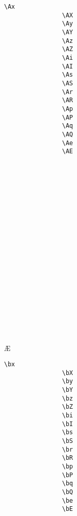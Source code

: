 \documentclass[10pt, a4paper]{article}
\begin{document}
\begin{enumerate}
		\begin{center}
			\begin{minipage}[h][8cm][t]{15em}
				\begin{lstlisting}[style=B]
				\Ax
				\AX
				\Ay
				\AY
				\Az
				\AZ
				\Ai
				\AI
				\As
				\AS
				\Ar
				\AR
				\Ap
				\AP
				\Aq
				\AQ
				\Ae
				\AE
				\end{lstlisting}
			\end{minipage}
			\begin{minipage}[h][8cm][t]{15em}
				\begin{fgls}
					\ \\
					\Ax\\
					\AX\\
					\Ay\\
					\AY\\
					\Az\\
					\AZ\\
					\Ai\\
					\AI\\
					\As\\
					\AS\\
					\Ar\\
					\AR\\
					\Ap\\
					\AP\\
					\Aq\\
					\AQ\\
					\Ae\\
					\AE
				\end{fgls}
			\end{minipage}
		\end{center}
		\begin{center}
			\begin{minipage}[h][8cm][t]{15em}
				\begin{lstlisting}[style=B]
				\bx
				\bX
				\by
				\bY
				\bz
				\bZ
				\bi
				\bI
				\bs
				\bS
				\br
				\bR
				\bp
				\bP
				\bq
				\bQ
				\be
				\bE
				\end{lstlisting}
			\end{minipage}
			\begin{minipage}[h][8cm][t]{15em}
				\begin{fgls}
					\ \\
					\bx\\
					\bX\\
					\by\\
					\bY\\
					\bz\\

\end{fgls}
\end{minipage}
\end{center}
\end{enumerate}
\end{document}
